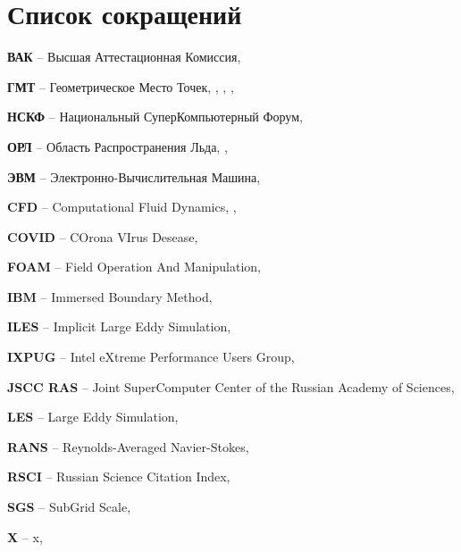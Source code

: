 \newpage

\section*{Список сокращений}

\textbf{ВАК} -- Высшая Аттестационная Комиссия, \pageref{abbr:vak-1}

\textbf{ГМТ} -- Геометрическое Место Точек, \pageref{abbr:gmt-1}, \pageref{abbr:gmt-2}, \pageref{abbr:gmt-3}, \pageref{abbr:gmt-4}

\textbf{НСКФ} -- Национальный СуперКомпьютерный Форум, \pageref{abbr:nscf-1}

\textbf{ОРЛ} -- Область Распространения Льда, \pageref{abbr:orl-1}, \pageref{abbr:orl-2}

\textbf{ЭВМ} -- Электронно-Вычислительная Машина, \pageref{abbr:evm-1}

\textbf{CFD} -- Computational Fluid Dynamics, \pageref{abbr:cfd-1}, \pageref{abbr:cfd-2}

\textbf{COVID} -- COrona VIrus Desease, \pageref{abbr:covid-1}

\textbf{FOAM} -- Field Operation And Manipulation, \pageref{abbr:foam-1}

\textbf{IBM} -- Immersed Boundary Method, \pageref{abbr:ibm-1}

\textbf{ILES} -- Implicit Large Eddy Simulation, \pageref{abbr:iles-1}

\textbf{IXPUG} -- Intel eXtreme Performance Users Group, \pageref{abbr:ixpug-1}

\textbf{JSCC RAS} -- Joint SuperComputer Center of the Russian Academy of Sciences, \pageref{abbr:jscc-ras-1}

\textbf{LES} -- Large Eddy Simulation, \pageref{abbr:les-1}

\textbf{RANS} -- Reynolds-Averaged Navier-Stokes, \pageref{abbr:rans-1}

\textbf{RSCI} -- Russian Science Citation Index, \pageref{abbr:rsci-1}

\textbf{SGS} -- SubGrid Scale, \pageref{abbr:sgs-1}

\textbf{X} -- x, \pageref{abbr:x}

